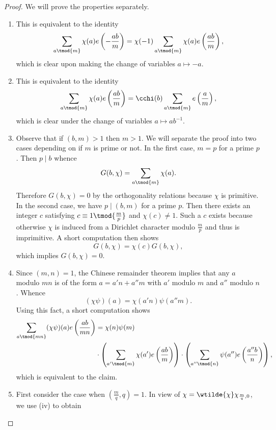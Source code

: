 \documentclass[12pt]{article}
\begin{document}
      \begin{proof}
        We will prove the properties separately.
        \begin{enumerate}[label*=(\roman*)]
          \item This is equivalent to the identity
          \[
            \sum_{a \tmod{m}}\chi(a)e\left(-\frac{ab}{m}\right) = \chi(-1)\sum_{a \tmod{m}}\chi(a)e\left(\frac{ab}{m}\right),
          \]
          which is clear upon making the change of variables \(a \mapsto -a\).
          \item This is equivalent to the identity
          \[
            \sum_{a \tmod {m}}\chi(a)e\left(\frac{ab}{m}\right) = \cchi(b)\sum_{a \tmod {m}}e\left(\frac{a}{m}\right),
          \]
          which is clear under the change of variables \(a \mapsto ab^{-1}\).
          \item Observe that if \((b,m) > 1\) then \(m > 1\). We will separate the proof into two cases depending on if \(m\) is prime or not. In the first case, \(m = p\) for a prime \(p\). Then \(p \mid b\) whence
          \[
            G(b,\chi) = \sum_{a \tmod{m}}\chi(a).
          \]
          Therefore \(G(b,\chi) = 0\) by the orthogonality relations because \(\chi\) is primitive. In the second case, we have \(p \mid (b,m)\) for a prime \(p\). Then there exists an integer \(c\) satisfying \(c \equiv 1 \tmod {\frac{m}{p}}\) and \(\chi(c) \neq 1\). Such a \(c\) exists because otherwise \(\chi\) is induced from a Dirichlet character modulo \(\frac{m}{p}\) and thus is imprimitive. A short computation then shows
          \[
            G(b,\chi) = \chi(c)G(b,\chi),
          \]
          which implies \(G(b,\chi) = 0\).
          \item Since \((m,n) = 1\), the Chinese remainder theorem implies that any \(a\) modulo \(mn\) is of the form \(a = a'n+a''m\) with \(a'\) modulo \(m\) and \(a''\) modulo \(n\). Whence
          \[
            (\chi\psi)(a) = \chi(a'n)\psi(a''m).
          \]
          Using this fact, a short computation shows
          \begin{align*}
            \sum_{a \tmod{mn}}(\chi\psi)(a)e\left(\frac{ab}{mn}\right) &= \chi(n)\psi(m) \\
            &\cdot \left(\sum_{a' \tmod{m}}\chi(a')e\left(\frac{ab}{m}\right)\right)\cdot \left(\sum_{a'' \tmod{n}}\psi(a'')e\left(\frac{a''b}{n}\right)\right),
          \end{align*}
          which is equivalent to the claim.
          \item First consider the case when \(\left(\frac{m}{q},q\right) = 1\). In view of \(\chi = \wtilde{\chi}\chi_{\frac{m}{q},0}\), we use (iv) to obtain

\end{enumerate}
\end{proof}
\end{document}
